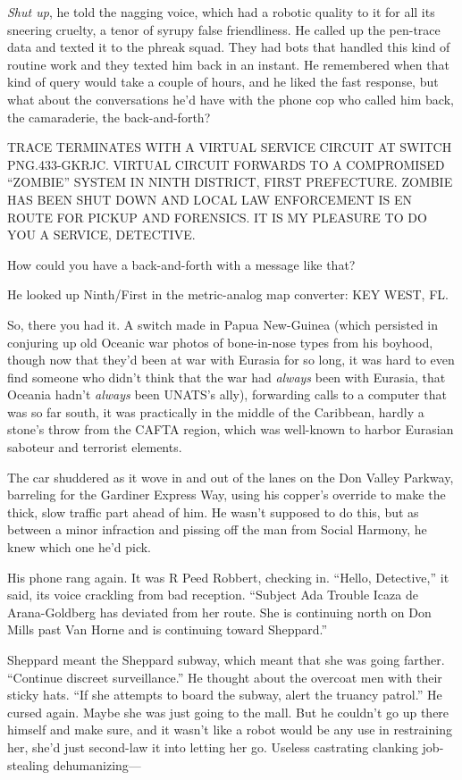 \emph{Shut up}, he told the nagging voice, which had a robotic
quality to it for all its sneering cruelty, a tenor of syrupy false
friendliness. He called up the pen-trace data and texted it to the
phreak squad. They had bots that handled this kind of routine work
and they texted him back in an instant. He remembered when that
kind of query would take a couple of hours, and he liked the fast
response, but what about the conversations he’d have with the phone
cop who called him back, the camaraderie, the back-and-forth?

TRACE TERMINATES WITH A VIRTUAL SERVICE CIRCUIT AT SWITCH
PNG.433-GKRJC. VIRTUAL CIRCUIT FORWARDS TO A COMPROMISED “ZOMBIE”
SYSTEM IN NINTH DISTRICT, FIRST PREFECTURE. ZOMBIE HAS BEEN SHUT
DOWN AND LOCAL LAW ENFORCEMENT IS EN ROUTE FOR PICKUP AND
FORENSICS. IT IS MY PLEASURE TO DO YOU A SERVICE, DETECTIVE.

How could you have a back-and-forth with a message like that?

He looked up Ninth/First in the metric-analog map converter: KEY
WEST, FL.

So, there you had it. A switch made in Papua New-Guinea (which
persisted in conjuring up old Oceanic war photos of bone-in-nose
types from his boyhood, though now that they’d been at war with
Eurasia for so long, it was hard to even find someone who didn’t
think that the war had \emph{always} been with Eurasia, that
Oceania hadn’t \emph{always} been UNATS’s ally), forwarding calls
to a computer that was so far south, it was practically in the
middle of the Caribbean, hardly a stone’s throw from the CAFTA
region, which was well-known to harbor Eurasian saboteur and
terrorist elements.

The car shuddered as it wove in and out of the lanes on the Don
Valley Parkway, barreling for the Gardiner Express Way, using his
copper’s override to make the thick, slow traffic part ahead of
him. He wasn’t supposed to do this, but as between a minor
infraction and pissing off the man from Social Harmony, he knew
which one he’d pick.

His phone rang again. It was R Peed Robbert, checking in. “Hello,
Detective,” it said, its voice crackling from bad reception.
“Subject Ada Trouble Icaza de Arana-Goldberg has deviated from her
route. She is continuing north on Don Mills past Van Horne and is
continuing toward Sheppard.”

Sheppard meant the Sheppard subway, which meant that she was going
farther. “Continue discreet surveillance.” He thought about the
overcoat men with their sticky hats. “If she attempts to board the
subway, alert the truancy patrol.” He cursed again. Maybe she was
just going to the mall. But he couldn’t go up there himself and
make sure, and it wasn’t like a robot would be any use in
restraining her, she’d just second-law it into letting her go.
Useless castrating clanking job-stealing dehumanizing—


